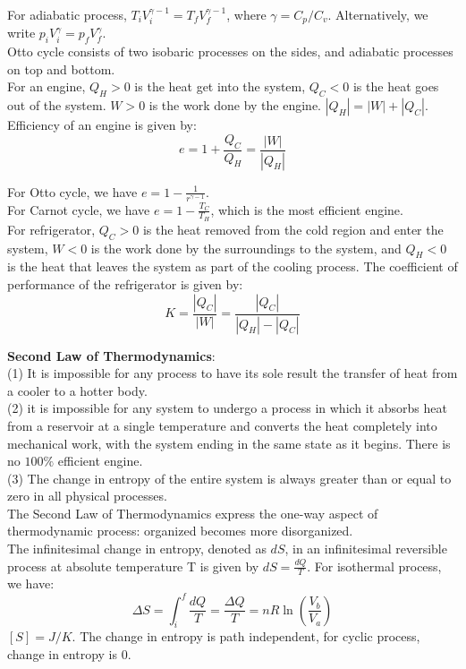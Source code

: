 \documentclass[10pt]{article}
\theoremstyle{break}
\theoremstyle{break}
\begin{document}
For adiabatic process, $T_iV_i^{\gamma-1}= T_fV_f^{\gamma-1}$, where $\gamma = C_p / C_v$. Alternatively, we write $p_iV_i^{\gamma} = p_fV_f^{\gamma}$.\\

Otto cycle consists of two isobaric processes on the sides, and adiabatic processes on top and bottom.\\

For an engine, $Q_H>0$ is the heat get into the system, $Q_C<0$ is the heat goes out of the system. $W>0$ is the work done by the engine. $|Q_H| = |W| + |Q_C|$. Efficiency of an engine is given by:$$e = 1+\frac{Q_C}{Q_H} = \frac{|W|}{|Q_H|}$$ 

For Otto cycle, we have $e = 1- \frac{1}{r^{\gamma-1}}$.\\
For Carnot cycle, we have $e = 1 - \frac{T_C}{T_H}$, which is the most efficient engine.\\

For refrigerator, $Q_C>0$ is the heat removed from the cold region and enter the system, $W<0$ is the work done by the surroundings to the system, and $Q_H < 0$ is the heat that leaves the system as part of the cooling process. The coefficient of performance of the refrigerator is given by: $$K = \frac{|Q_C|}{|W|} = \frac{|Q_C|}{|Q_H| - |Q_C|}$$

\textbf{Second Law of Thermodynamics}:\\
(1) It is impossible for any process to have its sole result the transfer of heat from a cooler to a hotter body.\\
(2) it is impossible for any system
to undergo a process in which it absorbs heat from a reservoir at a single temperature and converts the heat completely into mechanical work, with the system ending in the same state as it begins. There is no $100\%$ efficient engine.\\
(3) The change in entropy of the entire system is always greater than or equal to zero in all
physical processes.\\
The Second Law of Thermodynamics express the one-way aspect of thermodynamic process:
organized becomes more disorganized.\\

The infinitesimal change in entropy, denoted as $dS$, in an infinitesimal reversible process at absolute temperature T is given by $dS =
\frac{dQ}{T}$. For isothermal process, we have: $$\Delta S = \int_i^f \frac{dQ}{T} = \frac{\Delta Q}{T} = nR\ln(\frac{V_b}{V_a})$$ $[S] = J/K$. The change in entropy is path independent, for cyclic process, change in entropy is $0$.\\
\end{document}
